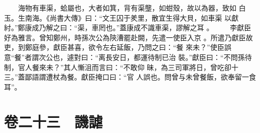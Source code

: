 \documentclass{ctexart}
\begin{document}
　　海物有車渠，蛤屬也，大者如箕，背有渠壟，如蚶殼，故以為器，致如 白玉。生南海。《尚書大傳》曰：``文王囚于羑里，散宜生得大貝，如車渠 以獻紂。''鄭康成乃解之曰：``渠，車罔也。''蓋康成不識車渠，謬解之耳 。 　　李獻臣好為雅言。曾知鄭州，時孫次公為陝漕罷赴闕，先遣一使臣入京 。所遣乃獻臣故吏，到鄭庭參，獻臣甚喜，欲令左右延飯，乃問之曰：``餐 來未？''使臣誤意``餐''者謂次公也，遽對曰：``离長安日，都運待制已治 裝。''獻臣曰：``不問孫待制，官人餐來未？''其人慚沮而言曰：``不敢仰 昧，為三司軍將日，曾吃卻十三。''蓋鄙語謂遭杖為餐。獻臣掩口曰：``官 人誤也。問曾与未曾餐飯，欲奉留一食耳''。
\clearpage
\section{卷二十三　譏謔}
\paragraph{}
\end{document}
